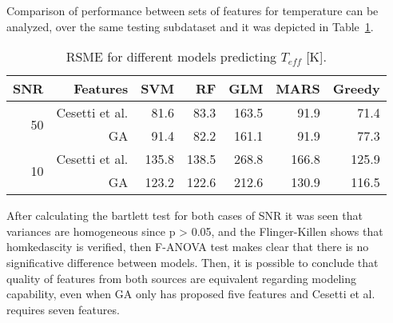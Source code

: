 {
Comparison of performance between sets of features for temperature 
can be analyzed, over the same testing subdataset and it was depicted 
in Table~\ref{tab:model_TSD}.

\begin{table}
\begin{center}
\begin{tabular}{rrrrrrr}
  \hline
  SNR & Features & SVM & RF & GLM  & MARS & Greedy \\
  \hline
  \multirow{2}{*}{50}  &  Cesetti et al. & 81.6 &  83.3 & 163.5 & 91.9 & 71.4 \\
      &  GA             & 91.4 & 82.2 & 161.1  & 91.9 & 77.3 \\
  \multirow{2}{*}{10}  &  Cesetti et al. & 135.8 & 138.5 & 268.8 & 166.8 & 125.9 \\
      &  GA             & 123.2 & 122.6 & 212.6 & 130.9 & 116.5 \\
   \hline
\end{tabular}
\caption { RSME for different models predicting $T_{eff}$ [K].} 
\label{tab:model_TSD} 
\end{center}
\end{table}

After calculating the bartlett test for both cases of SNR it was 
seen that variances are homogeneous since p > 0.05, and 
the Flinger-Killen shows that homkedascity is verified, 
then F-ANOVA test makes clear that there is no significative 
difference between models. Then, it is possible to conclude
that quality of features from both sources are equivalent
regarding modeling capability, even when GA only has proposed five
features and Cesetti et al. requires seven features.

}

